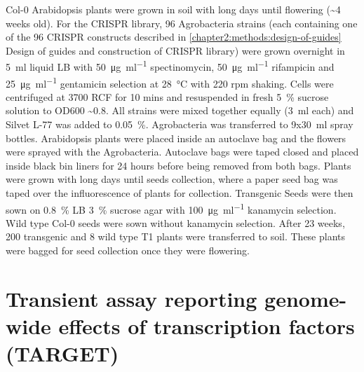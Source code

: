 \documentclass[../main.tex]{subfiles}
\begin{document}
Col-0 Arabidopsis plants were grown in soil with long days until flowering (\textasciitilde{}4 weeks old).
For the CRISPR library, 96 Agrobacteria strains (each containing one of the 96 CRISPR constructs described in \autoref{chapter2:methods:design-of-guides} Design of guides and construction of CRISPR library) were grown overnight in \SI{5}{\ml} liquid LB with \SI{50}{\micro\gram\per\ml} spectinomycin, \SI{50}{\micro\gram\per\ml} rifampicin and \SI{25}{\micro\gram\per\ml} gentamicin selection at \SI{28}{\celsius} with 220 rpm shaking.
Cells were centrifuged at 3700 RCF for 10 mins and resuspended in fresh \SI{5}{\percent} sucrose solution to OD600 \textasciitilde{}0.8.
All strains were mixed together equally (\SI{3}{\ml} each) and Silvet L-77 was added to \SI{0.05}{\percent}.
Agrobacteria was transferred to 9x\SI{30}{\ml} spray bottles.
Arabidopsis plants were placed inside an autoclave bag and the flowers were sprayed with the Agrobacteria.
Autoclave bags were taped closed and placed inside black bin liners for 24 hours before being removed from both bags.
Plants were grown with long days until seeds collection, where a paper seed bag was taped over the influorescence of plants for collection.
Transgenic Seeds were then sown on \SI{0.8}{\percent} LB \SI{3}{\percent} sucrose agar with \SI{100}{\micro\gram\per\ml} kanamycin selection.
Wild type Col-0 seeds were sown without kanamycin selection.
After 2\textendash{}3 weeks, 200 transgenic and 8 wild type T1 plants were transferred to soil.
These plants were bagged for seed collection once they were flowering.

\section{Transient assay reporting genome\hyp{}wide effects of transcription factors (TARGET)}\label{chapter2:methods:TARGET}
\end{document}
